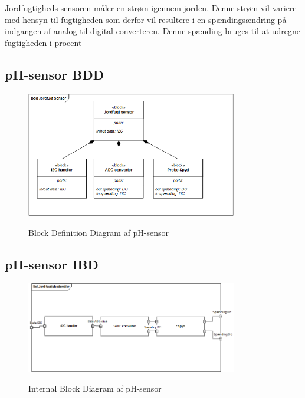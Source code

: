 
Jordfugtigheds sensoren måler en strøm igennem jorden. Denne strøm vil variere med hensyn til fugtigheden som derfor vil resultere i en spændingsændring på indgangen af analog til digital converteren. Denne spænding bruges til at udregne fugtigheden i procent

\subsection{pH-sensor BDD}

\begin{figure}[H]
	\centering
	\includegraphics[width=0.82\textwidth]{Systemarkitektur/Sensor_jordfugtighed/JordFugt_probe_BDD.png}
	\label{fig:pH-sensor BDD}
	\caption{Block Definition Diagram af pH-sensor}
\end{figure}



\subsection{pH-sensor IBD}

\begin{figure}[H]
	\centering
	\includegraphics[width=0.82\textwidth]{Systemarkitektur/Sensor_jordfugtighed/JordFugt_probe_IBD.png}
	\label{fig:pH-sensor IBD}
	\caption{Internal Block Diagram af pH-sensor}
\end{figure}